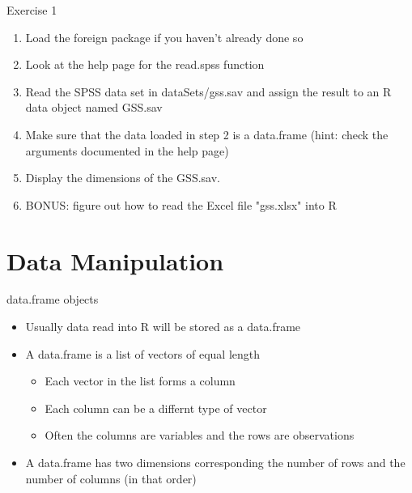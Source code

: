 \documentclass[table,smaller]{beamer}
\begin{document}
\begin{frame}[label=sec-5-6]{Exercise 1}
\begin{enumerate}
\item Load the foreign package if you haven't already done so

\item Look at the help page for the read.spss function

\item Read the SPSS data set in dataSets/gss.sav and assign the result to an R data object named GSS.sav

\item Make sure that the data loaded in step 2 is a data.frame (hint: check the arguments documented in the help page)

\item Display the dimensions of the GSS.sav.

\item BONUS: figure out how to read the Excel file "gss.xlsx" into R
\end{enumerate}
\end{frame}


\section{Data Manipulation}
\label{sec-6}

\begin{frame}[label=sec-6-1]{data.frame objects}
\begin{itemize}
\item Usually data read into R will be stored as a \alert{data.frame}

\item A data.frame is a list of vectors of equal length
\begin{itemize}
\item Each vector in the list forms a column
\item Each column can be a differnt type of vector
\item Often the columns are variables and the rows are observations
\end{itemize}

\item A data.frame has two dimensions corresponding the number of rows and the number of columns (in that order)
\end{itemize}
\end{frame}
\end{document}

